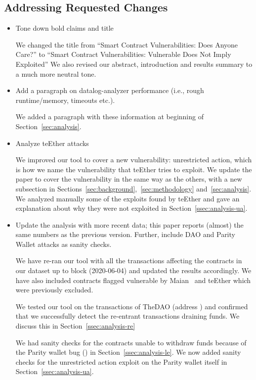 \subsection{Addressing Requested Changes}
\begin{itemize}
  \setlength{\itemsep}{1pt}
\item Tone down bold claims and title

  We changed the title from ``Smart Contract Vulnerabilities: Does Anyone Care?'' to ``Smart Contract Vulnerabilities: Vulnerable Does Not Imply Exploited''
  We also revised our abstract, introduction and results summary to a much more neutral tone.

\item Add a paragraph on datalog-analyzer performance (i.e., rough runtime/memory, timeouts etc.).

  We added a paragraph with these information at beginning of Section~\ref{sec:analysis}.

\item Analyze teEther attacks

  We improved our tool to cover a new vulnerability: unrestricted action, which is how we name the vulnerability that teEther tries to exploit. We update the paper to cover the vulnerability in the same way as the others, with a new subsection in Sections~\ref{sec:background},~\ref{sec:methodology} and~\ref{sec:analysis}.
  We analyzed manually some of the exploits found by teEther and gave an explanation about why they were not exploited in Section~\ref{ssec:analysis-ua}.

\item Update the analysis with more recent data; this paper reports (almost) the same numbers as the previous version. Further, include DAO and Parity Wallet attacks as sanity checks.

  We have re-ran our tool with all the transactions affecting the contracts in our dataset up to block  (2020-06-04) and updated the results accordingly.
  We have also included contracts flagged vulnerable by Maian~\cite{Nikolic2018a} and teEther which were previously excluded.

  We tested our tool on the transactions of TheDAO (address ) and confirmed that we successfully detect the re-entrant transactions draining funds. We discuss this in Section~\ref{ssec:analysis-re}

  We had sanity checks for the contracts unable to withdraw funds because of the Parity wallet bug () in Section~\ref{ssec:analysis-le}. We now added sanity checks for the unrestricted action exploit on the Parity wallet itself in Section~\ref{ssec:analysis-ua}.


\end{itemize}
